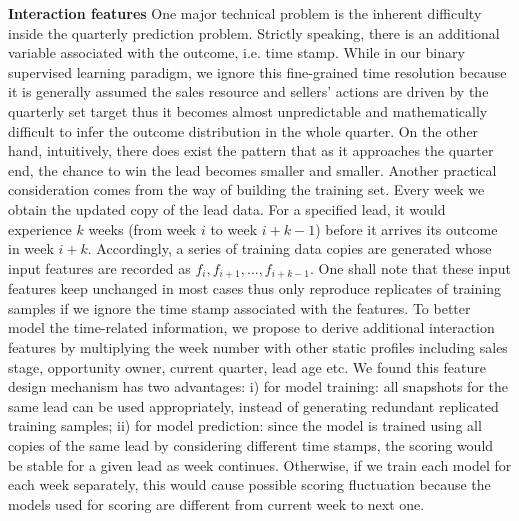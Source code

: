 \documentclass[10pt,conference]{IEEEtran}
\begin{document}
\textbf{Interaction features} One major technical problem is the inherent difficulty inside the quarterly prediction problem. Strictly speaking, there is an additional variable associated with the outcome, i.e. time stamp. While in our binary supervised learning paradigm, we ignore this fine-grained time resolution because it is generally assumed the sales resource and sellers' actions are driven by the quarterly set target thus it becomes almost unpredictable and mathematically difficult to infer the outcome distribution in the whole quarter. On the other hand, intuitively, there does exist the pattern that as it approaches the quarter end, the chance to win the lead becomes smaller and smaller. Another practical consideration comes from the way of building the training set. Every week we obtain the updated copy of the lead data. For a specified lead, it would experience $k$ weeks (from week $i$ to week $i+k-1$) before it arrives its outcome in week $i+k$. Accordingly, a series of training data copies are generated whose input features are recorded as $f_i, f_{i+1}, \ldots, f_{i+k-1}$. One shall note that these input features keep unchanged in most cases thus only reproduce replicates of training samples if we ignore the time stamp associated with the features. To better model the time-related information, we propose to derive additional interaction features by multiplying the week number with other static profiles including sales stage, opportunity owner, current quarter, lead age etc. We found this feature design mechanism has two advantages: i) for model training: all snapshots for the same lead can be used appropriately, instead of generating redundant replicated training samples; ii) for model prediction: since the model is trained using all copies of the same lead by considering different time stamps, the scoring would be stable for a given lead as week continues. Otherwise, if we train each model for each week separately, this would cause possible scoring fluctuation because the models used for scoring are different from current week to next one.
\end{document}
